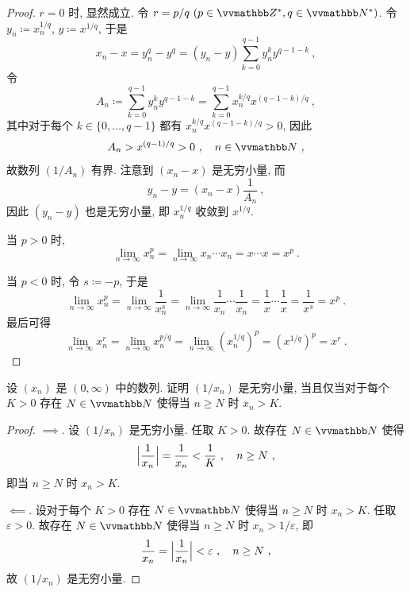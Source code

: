 \begin{proof}
    \(r = 0\) 时, 显然成立. 令 \(r = p / q\ (p \in \Z^\ast, q \in \N^\ast)\). 令 \(y_n \coloneqq x_n^{1 / q}\), \(y \coloneqq x^{1 / q}\), 于是
    \[
        x_n - x = y_n^q - y^q = (y_n - y) \sum_{k = 0}^{q - 1} y_n^k y^{q - 1 - k}\ ,
    \]
    令
    \[
        A_n \coloneqq \sum_{k = 0}^{q - 1} y_n^k y^{q - 1 - k} = \sum_{k = 0}^{q - 1} x_n^{k / q} x^{(q - 1 - k) / q}\ ,
    \]
    其中对于每个 \(k \in \{0, \ldots, q - 1\}\) 都有 \(x_n^{k / q} x^{(q - 1 - k) / q} > 0\), 因此
    \[
        A_n > x^{(q - 1) / q} > 0\ ,\quad n \in \N\ ,
    \]
    故数列 \((1 / A_n)\) 有界. 注意到 \((x_n - x)\) 是无穷小量, 而
    \[
        y_n - y = (x_n - x) \frac{1}{A_n}\ ,
    \]
    因此 \((y_n - y)\) 也是无穷小量, 即 \(x_n^{1 / q}\) 收敛到 \(x^{1 / q}\).
    
    当 \(p > 0\) 时,
    \[
        \lim_{n \to \infty} x_n^p = \lim_{n \to \infty} x_n \cdots x_n = x \cdots x = x^p\ .
    \]

    当 \(p < 0\) 时, 令 \(s \coloneqq - p\), 于是
    \[
        \lim_{n \to \infty} x_n^p = \lim_{n \to \infty} \frac{1}{x_n^s} = \lim_{n \to \infty} \frac{1}{x_n} \cdots \frac{1}{x_n} = \frac{1}{x} \cdots \frac{1}{x} = \frac{1}{x^s} = x^p\ .
    \]
    最后可得
    \[
        \lim_{n \to \infty} x_n^r = \lim_{n \to \infty} x_n^{p / q} = \lim_{n \to \infty} (x_n^{1 / q})^p = (x^{1 / q})^p = x^r\ .
    \]
\end{proof}

\begin{exercise}\label{ex:null-sequences-always-smaller}
    设 \((x_n)\) 是 \((0, \infty)\) 中的数列. 证明 \((1 / x_n)\) 是无穷小量, 当且仅当对于每个 \(K > 0\) 存在 \(N \in \N\) 使得当 \(n \geq N\) 时 \(x_n > K\).
\end{exercise}

\begin{proof}
    \(\implies\). 设 \((1 / x_n)\) 是无穷小量. 任取 \(K > 0\). 故存在 \(N \in \N\) 使得
    \[
        \Bigl|\frac{1}{x_n}\Bigr| = \frac{1}{x_n} < \frac{1}{K}\ ,\quad n \geq N\ ,
    \]
    即当 \(n \geq N\) 时 \(x_n > K\).

    \(\impliedby\). 设对于每个 \(K > 0\) 存在 \(N \in \N\) 使得当 \(n \geq N\) 时 \(x_n > K\). 任取 \(\varepsilon > 0\). 故存在 \(N \in \N\) 使得当 \(n \geq N\) 时 \(x_n > 1 / \varepsilon\), 即
    \[
        \frac{1}{x_n} = \Bigl|\frac{1}{x_n}\Bigr| < \varepsilon\ ,\quad n \geq N\ ,
    \]
    故 \((1 / x_n)\) 是无穷小量.
\end{proof}

